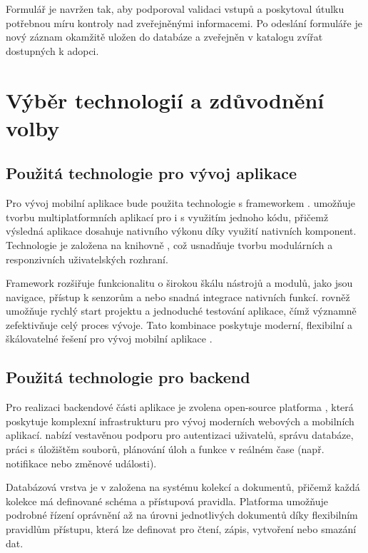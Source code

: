 \documentclass[czech, bp, kiv, he, iso690numb, pdf]{fasthesis}
\begin{document}
    Formulář je navržen tak, aby podporoval validaci vstupů a poskytoval útulku potřebnou míru kontroly nad zveřejněnými informacemi. Po odeslání formuláře je nový záznam okamžitě uložen do databáze a zveřejněn v katalogu zvířat dostupných k adopci.


    \section{Výběr technologií a zdůvodnění volby}

    \subsection{Použitá technologie pro vývoj aplikace}

    Pro vývoj mobilní aplikace bude použita technologie  s frameworkem .  umožňuje tvorbu multiplatformních aplikací pro  i  s využitím jednoho kódu, přičemž výsledná aplikace dosahuje nativního výkonu díky využití nativních komponent. Technologie  je založena na knihovně , což usnadňuje tvorbu modulárních a responzivních uživatelských rozhraní.

    Framework  rozšiřuje funkcionalitu  o širokou škálu nástrojů a modulů, jako jsou navigace, přístup k senzorům a  nebo snadná integrace nativních funkcí.  rovněž umožňuje rychlý start projektu a jednoduché testování aplikace, čímž významně zefektivňuje celý proces vývoje. Tato kombinace poskytuje moderní, flexibilní a škálovatelné řešení pro vývoj mobilní aplikace \cite{reactnative}.



    \subsection{Použitá technologie pro backend}

    Pro realizaci backendové části aplikace je zvolena open-source platforma , která poskytuje komplexní infrastrukturu pro vývoj moderních webových a mobilních aplikací.  nabízí vestavěnou podporu pro autentizaci uživatelů, správu databáze, práci s úložištěm souborů, plánování úloh a funkce v reálném čase (např. notifikace nebo změnové události).

    Databázová vrstva je v  založena na systému kolekcí a dokumentů, přičemž každá kolekce má definované schéma a přístupová pravidla. Platforma umožňuje podrobné řízení oprávnění až na úrovni jednotlivých dokumentů díky flexibilním pravidlům přístupu, která lze definovat pro čtení, zápis, vytvoření nebo smazání dat.
\end{document}

